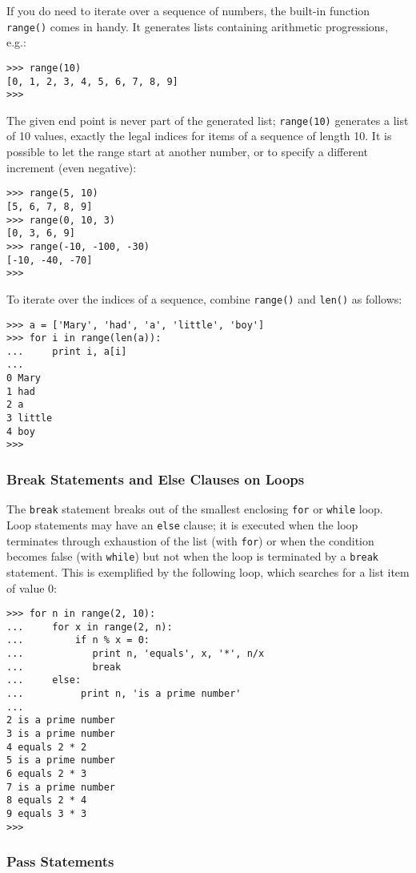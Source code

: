 If you do need to iterate over a sequence of numbers, the built-in
function {\tt range()} comes in handy.
It generates lists containing arithmetic progressions,
e.g.:
\bcode\begin{verbatim}
>>> range(10)
[0, 1, 2, 3, 4, 5, 6, 7, 8, 9]
>>> 
\end{verbatim}\ecode
The given end point is never part of the generated list;
{\tt range(10)} generates a list of 10 values,
exactly the legal indices for items of a sequence of length 10.
It is possible to let the range start at another number, or to specify a
different increment (even negative):
\bcode\begin{verbatim}
>>> range(5, 10)
[5, 6, 7, 8, 9]
>>> range(0, 10, 3)
[0, 3, 6, 9]
>>> range(-10, -100, -30)
[-10, -40, -70]
>>> 
\end{verbatim}\ecode
To iterate over the indices of a sequence, combine {\tt range()}
and {\tt len()} as follows:
\bcode\begin{verbatim}
>>> a = ['Mary', 'had', 'a', 'little', 'boy']
>>> for i in range(len(a)):
...     print i, a[i]
... 
0 Mary
1 had
2 a
3 little
4 boy
>>> 
\end{verbatim}\ecode

\subsubsection{Break Statements and Else Clauses on Loops}

The {\tt break} statement breaks out of the smallest enclosing {\tt for}
or {\tt while} loop.
Loop statements may have an {\tt else} clause; it is executed when the
loop terminates through exhaustion of the list (with {\tt for}) or when
the condition becomes false (with {\tt while}) but not when the loop is
terminated by a {\tt break} statement.
This is exemplified by the following loop, which searches for a list
item of value 0:
\bcode\begin{verbatim}
>>> for n in range(2, 10):
...     for x in range(2, n):
...         if n % x = 0:
...            print n, 'equals', x, '*', n/x
...            break
...     else:
...          print n, 'is a prime number'
... 
2 is a prime number
3 is a prime number
4 equals 2 * 2
5 is a prime number
6 equals 2 * 3
7 is a prime number
8 equals 2 * 4
9 equals 3 * 3
>>> 
\end{verbatim}\ecode

\subsubsection{Pass Statements}

